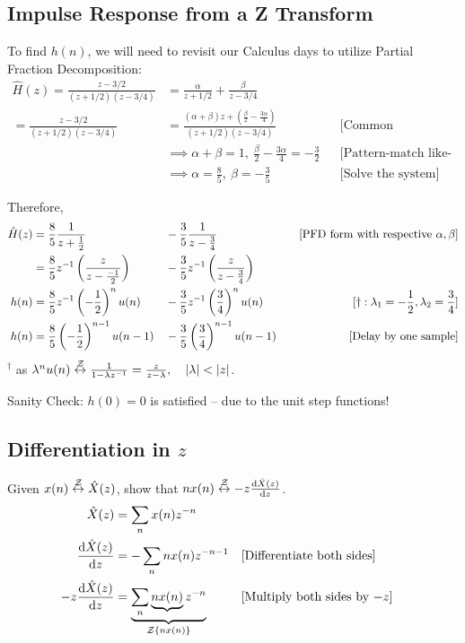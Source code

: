 \subsection{Impulse Response from a Z Transform}
To find $h(n)$, we will need to revisit our Calculus days to utilize Partial Fraction Decomposition:
\begin{align*}
    \hat{H}(z)
    =\frac{z-3 / 2}{(z+1 / 2)(z-3 / 4)}
    &=\frac{\alpha}{z+1 / 2}+\frac{\beta}{z-3 / 4}
    \\
    =\frac{z-3 / 2}{(z+1 / 2)(z-3 / 4)}
    &=\frac{(\alpha+\beta)z+(\frac\beta2-\frac{3\alpha}{4})}{(z+1 / 2)(z-3 / 4)}
    &&\text{[Common Denominator]}
    \\
    &\implies
    \alpha+\beta=1,\ \frac\beta2-\frac{3\alpha}{4}=-\frac32
    &&\text{[Pattern-match like-terms]}
    \\
    &\implies
    \alpha=\frac85, \ \beta=-\frac35
    &&\text{[Solve the system]}
\end{align*}

Therefore,
\begin{align*}
    \hat{H}(z)
    &=\frac{8}{5} \frac{1}{z+\frac{1}{2}}
    &&-\frac{3}{5} \frac{1}{z-\frac{3}{4}}
    &&&\text{[PFD form with respective $\alpha,\beta$]}
    \\
    &=\frac{8}{5}z^{-1}\left(\frac{z}{z-\frac{-1}{2}}\right) 
    &&-\frac{3}{5}z^{-1}\left(\frac{z}{z-\frac{3}{4}}\right)
    \\
    h(n)
    &=\frac{8}{5}z^{-1}\left(-\frac{1}{2}\right)^{n} u(n)
    &&-\frac{3}{5}z^{-1}\left(\frac{3}{4}\right)^{n} u(n)
    &&&[\dagger: \lambda_1=-\frac12, \lambda_2=\frac34]
    \\
    h(n)
    &=\frac{8}{5}\left(-\frac{1}{2}\right)^{n-1} u(n-1)
    &&-\frac{3}{5}\left(\frac{3}{4}\right)^{n-1} u(n-1)
    &&&\text{[Delay by one sample]}
\end{align*}
$^\dagger$ as $\lambda^n u(n)\zt \frac1{1-\lambda\zinv}=\frac{z}{z-\lambda},\quad|\lambda|<|z|$.

Sanity Check: $h(0)=0$ is satisfied -- due to the unit step functions!

\subsection{Differentiation in \texorpdfstring{$z$}{z}}
Given $x(n)\stackrel{\mathcal{Z}}{\leftrightarrow} \hat{X}(z)$, show that $nx(n)\stackrel{\mathcal{Z}}{\leftrightarrow} -z\frac{\mathrm d{\hat{X}(z)}}{\mathrm d{z}}$.
\begin{align*}
    \hat{X}(z) 
    &= \sum_n x(n)z^{-n}
    \\
    \frac{\mathrm d{\hat{X}(z)}}{\mathrm d{z}} 
    &= -\sum_n n x(n) z^{-n-1}
    &&\text{[Differentiate both sides]}
    \\
    -z\frac{\mathrm d{\hat{X}(z)}}{\mathrm d{z}} 
    &= \underbrace{\sum_n \underbrace{n x(n)} z^{-n}}_{\mathcal Z\{nx(n)\}}
    &&\text{[Multiply both sides by $-z$]}
\end{align*}

